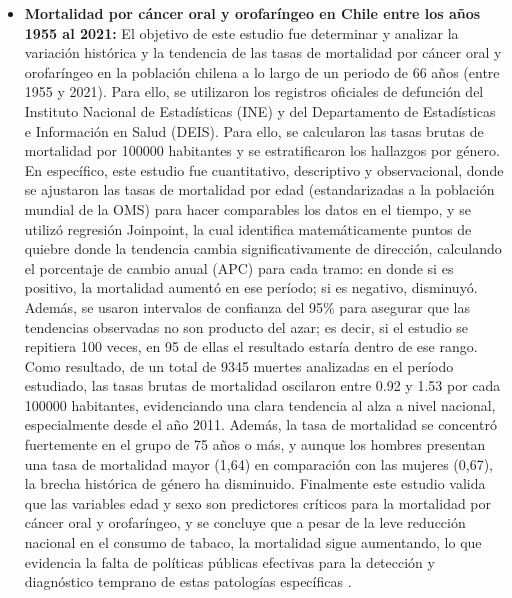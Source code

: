 \begin{itemize}
    \item \textbf{Mortalidad por cáncer oral y orofaríngeo en Chile entre los años 1955 al 2021:} El objetivo de este estudio fue determinar y analizar la variación histórica y la tendencia de las tasas de mortalidad por cáncer oral y orofaríngeo en la población chilena a lo largo de un periodo de 66 años (entre 1955 y 2021). Para ello, se utilizaron los registros oficiales de defunción del Instituto Nacional de Estadísticas (INE) y del Departamento de Estadísticas e Información en Salud (DEIS). Para ello, se calcularon las tasas brutas de mortalidad por 100000 habitantes y se estratificaron los hallazgos por género. En específico, este estudio fue cuantitativo, descriptivo y observacional, donde se ajustaron las tasas de mortalidad por edad (estandarizadas a la población mundial de la OMS) para hacer comparables los datos en el tiempo, y se utilizó regresión Joinpoint, la cual identifica matemáticamente puntos de quiebre donde la tendencia cambia significativamente de dirección, calculando el porcentaje de cambio anual (APC) para cada tramo: en donde si es positivo, la mortalidad aumentó en ese período; si es negativo, disminuyó. Además, se usaron intervalos de confianza del 95\% para asegurar que las tendencias observadas no son producto del azar; es decir, si el estudio se repitiera 100 veces, en 95 de ellas el resultado estaría dentro de ese rango. Como resultado, de un total de 9345 muertes analizadas en el período estudiado, las tasas brutas de mortalidad oscilaron entre 0.92 y 1.53 por cada 100000 habitantes, evidenciando una clara tendencia al alza a nivel nacional, especialmente desde el año 2011. Además, la tasa de mortalidad se concentró fuertemente en el grupo de 75 años o más, y aunque los hombres presentan una tasa de mortalidad mayor (1,64) en comparación con las mujeres (0,67), la brecha histórica de género ha disminuido. Finalmente este estudio valida que las variables edad y sexo son predictores críticos para la mortalidad por cáncer oral y orofaríngeo, y se concluye que a pesar de la leve reducción nacional en el consumo de tabaco, la mortalidad sigue aumentando, lo que evidencia la falta de políticas públicas efectivas para la detección y diagnóstico temprano de estas patologías específicas \cite{scielo2}.

\end{itemize}
